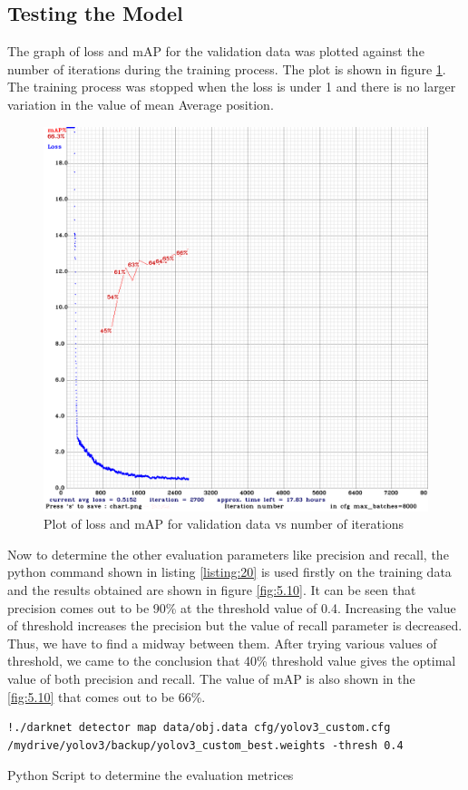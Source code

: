 \subsection{Testing the Model}
The graph of loss and mAP for the validation data was plotted against the number of iterations during the training process. The plot is shown in figure \ref{fig:5.9}. The training process was stopped when the loss is under 1 and there is no larger variation in the value of mean Average position.
\begin{figure}[H]
\centering
\captionsetup{justification = centering}
\includegraphics[scale= 0.2]{CHAPTERS/Chapter-5/images/5.9.PNG}
\caption{Plot of loss and mAP for validation data vs number of iterations}
\label{fig:5.9}
\end{figure}

Now to determine the other evaluation parameters like precision and recall, the python command shown in listing \ref{listing:20} is used firstly on the training data and the results obtained are shown in figure \ref{fig:5.10}. It can be seen that precision comes out to be 90\% at the threshold value of 0.4. Increasing the value of threshold increases the precision but the value of recall parameter is decreased. Thus, we have to find a midway between them. After trying various values of threshold, we came to the conclusion that 40\% threshold value gives the optimal value of both precision and recall. The value of mAP is also shown in the \ref{fig:5.10} that comes out to be 66\%.
\begin{longlisting}
\begin{verbatim}
!./darknet detector map data/obj.data cfg/yolov3_custom.cfg 
/mydrive/yolov3/backup/yolov3_custom_best.weights -thresh 0.4
\end{verbatim}
\caption{Python Script to determine the evaluation metrices}
\label{listing:20}
\end{longlisting}

